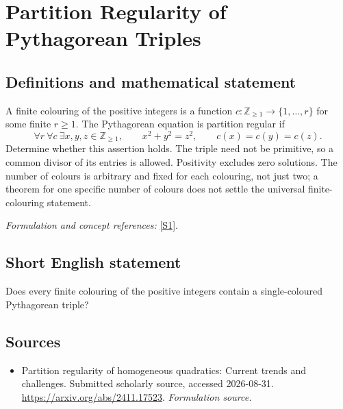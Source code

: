 \documentclass[11pt]{article}
\begin{document}
\section*{\texorpdfstring{Partition Regularity of Pythagorean Triples}{Partition Regularity of Pythagorean Triples}}\label{381}
\subsection{Definitions and mathematical statement}
A finite colouring of the positive integers is a function $c:{\mathbb{Z}}_{\ge1}\to\{1,\ldots,r\}$ for some finite $r\ge1$. The Pythagorean equation is partition regular if
\[
 \forall r\ \forall c\ \exists x,y,z\in{\mathbb{Z}}_{\ge1},
 \qquad x^2+y^2=z^2,
 \qquad c(x)=c(y)=c(z).
\]
Determine whether this assertion holds. The triple need not be primitive, so a common divisor of its entries is allowed. Positivity excludes zero solutions. The number of colours is arbitrary and fixed for each colouring, not just two; a theorem for one specific number of colours does not settle the universal finite-colouring statement.
\par\smallskip\textit{Formulation and concept references:} \href{https://arxiv.org/abs/2411.17523}{[S1]}.

\subsection{Short English statement}
Does every finite colouring of the positive integers contain a single-coloured Pythagorean triple?
\subsection{Sources}
\begin{itemize}
\item[S1]Partition regularity of homogeneous quadratics: Current trends and challenges. Submitted scholarly source, accessed 2026-08-31.
\url{https://arxiv.org/abs/2411.17523}.
\textit{Formulation source.}
\end{itemize}
\end{document}
